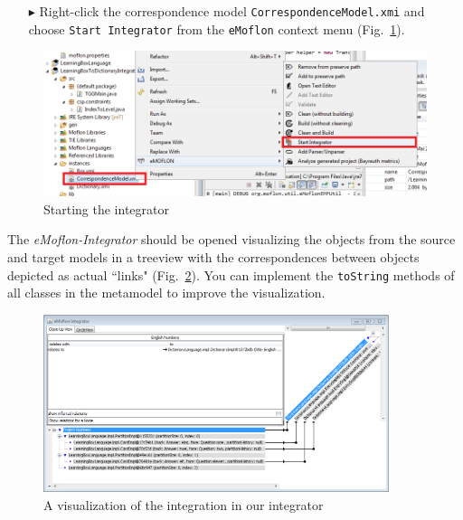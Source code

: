 \begin{enumerate}
\item[$\blacktriangleright$] Right-click the correspondence model \texttt{Correspondence\-Model\-.xmi} and choose \texttt{Start Integrator} from the \texttt{eMoflon} context menu (Fig.~\ref{fig:startintegrator}).
\end{enumerate}

\begin{figure}[htbp]
\begin{center}
  \includegraphics[width=\textwidth]{pics/tggBilder/transformation/tgg29}
  \caption{Starting the integrator}  
  \label{fig:startintegrator}
\end{center}
\end{figure} 

The \emph{eMoflon-Integrator} should be opened visualizing the objects from the source and target models in a treeview with the correspondences between objects depicted as actual ``links" (Fig.~\ref{fig:emoflonintegrator}).
You can implement the \texttt{toString} methods of all classes in the metamodel to improve the visualization.

\begin{figure}[htbp]
\begin{center}
  \includegraphics[width=0.9\textwidth]{pics/tggBilder/transformation/tgg30}
  \caption{A visualization of the integration in our integrator}  
  \label{fig:emoflonintegrator}
\end{center}
\end{figure} 